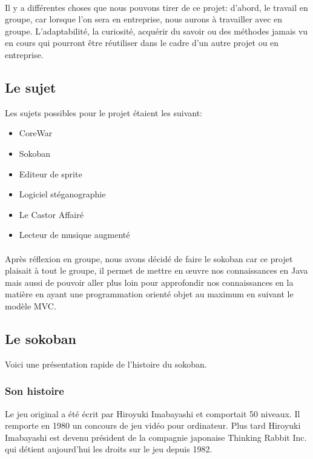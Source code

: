 \documentclass[a4paper,12pt]{article} %
\begin{document}
\paragraph{}
	
	Il y a différentes choses que nous pouvons tirer de ce projet: d'abord, le travail en groupe, car lorsque l'on sera en entreprise, nous aurons à travailler avec en groupe. L'adaptabilité, la curiosité, acquérir du savoir ou des méthodes jamais vu en cours qui pourront être réutiliser dans le cadre d'un autre projet ou en entreprise.
	   
	\subsection{Le sujet}
	
	Les sujets possibles pour le projet étaient les suivant:
	\vspace{0.1cm}
	
\begin{itemize}
\item CoreWar
\item Sokoban
\item Editeur de sprite
\item Logiciel stéganographie
\item Le Castor Affairé
\item Lecteur de musique augmenté
\end{itemize}
\paragraph{}		

	Après réflexion en groupe, nous avons décidé de faire le sokoban car ce projet plaisait à tout le groupe, il permet de mettre en œuvre nos connaissances en Java mais aussi de pouvoir aller plus loin pour approfondir nos connaissances en la matière en ayant une programmation orienté objet au maximum en suivant le modèle MVC.
	
	\subsection{Le sokoban}
	Voici une présentation rapide de l'histoire du sokoban.
	
	\subsubsection{Son histoire}
	Le jeu original a été écrit par Hiroyuki Imabayashi et comportait 50 niveaux. Il remporte en 1980 un concours de jeu vidéo pour ordinateur. Plus tard Hiroyuki Imabayashi est devenu président de la compagnie japonaise Thinking Rabbit Inc. qui détient aujourd'hui les droits sur le jeu depuis 1982.
	
\end{document}
